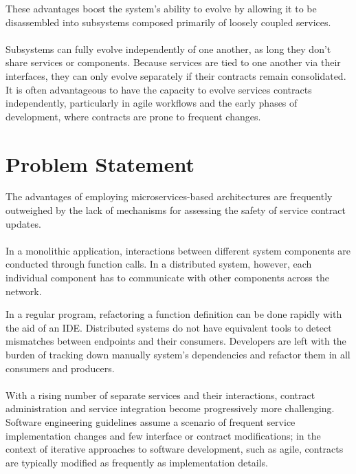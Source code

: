These advantages boost the system's ability to evolve by allowing it to be disassembled into subsystems composed primarily of loosely coupled services.

\paragraph{}

Subsystems can fully evolve independently of one another, as long they don't share services or components.
Because services are tied to one another via their interfaces, they can only evolve separately if their contracts remain consolidated.
It is often advantageous to have the capacity to evolve services contracts independently,
particularly in agile workflows and the early phases of development, where contracts are prone to frequent changes.

\section{Problem Statement} %
\label{sec:problem_statement}

The advantages of employing microservices-based architectures are frequently outweighed by the lack of mechanisms for assessing the safety of service contract updates.

\paragraph{}

In a monolithic application, interactions between different system components are conducted through function calls.
In a distributed system, however, each individual component has to communicate with other components across the network.

In a regular program, refactoring a function definition can be done rapidly with the aid of an IDE.
Distributed systems do not have equivalent tools to detect mismatches between endpoints and their consumers.
Developers are left with the burden of tracking down manually system's dependencies and refactor them in all consumers and producers.

\paragraph{}

With a rising number of separate services and their interactions, contract administration and service integration become progressively more challenging.
Software engineering guidelines assume a scenario of frequent service implementation changes and few interface or contract modifications;
in the context of iterative approaches to software development, such as agile, contracts are typically modified as frequently as implementation details.

